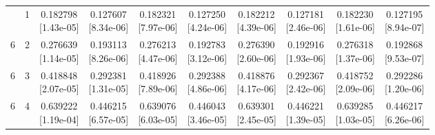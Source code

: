 \documentclass[12pt,letterpaper]{article}
\theoremstyle{plain}
\theoremstyle{definition}
\begin{document}
\begin{table}[p]
\begin{adjustbox}{max width=\linewidth}
\begin{tabular}{@{}rr*{8}{c}@{}}
\addlinespace[2pt]
6 & 1 & \shortstack{0.182798\\[-1pt]{\scriptsize[1.43e-05]}} & \shortstack{0.127607\\[-1pt]{\scriptsize[8.34e-06]}} & \shortstack{0.182321\\[-1pt]{\scriptsize[7.97e-06]}} & \shortstack{0.127250\\[-1pt]{\scriptsize[4.24e-06]}} & \shortstack{0.182212\\[-1pt]{\scriptsize[4.39e-06]}} & \shortstack{0.127181\\[-1pt]{\scriptsize[2.46e-06]}} & \shortstack{0.182230\\[-1pt]{\scriptsize[1.61e-06]}} & \shortstack{0.127195\\[-1pt]{\scriptsize[8.94e-07]}}\\
6 & 2 & \shortstack{0.276639\\[-1pt]{\scriptsize[1.14e-05]}} & \shortstack{0.193113\\[-1pt]{\scriptsize[8.26e-06]}} & \shortstack{0.276213\\[-1pt]{\scriptsize[4.47e-06]}} & \shortstack{0.192783\\[-1pt]{\scriptsize[3.12e-06]}} & \shortstack{0.276390\\[-1pt]{\scriptsize[2.60e-06]}} & \shortstack{0.192916\\[-1pt]{\scriptsize[1.93e-06]}} & \shortstack{0.276318\\[-1pt]{\scriptsize[1.37e-06]}} & \shortstack{0.192868\\[-1pt]{\scriptsize[9.53e-07]}}\\
6 & 3 & \shortstack{0.418848\\[-1pt]{\scriptsize[2.07e-05]}} & \shortstack{0.292381\\[-1pt]{\scriptsize[1.31e-05]}} & \shortstack{0.418926\\[-1pt]{\scriptsize[7.89e-06]}} & \shortstack{0.292388\\[-1pt]{\scriptsize[4.86e-06]}} & \shortstack{0.418876\\[-1pt]{\scriptsize[4.17e-06]}} & \shortstack{0.292367\\[-1pt]{\scriptsize[2.42e-06]}} & \shortstack{0.418752\\[-1pt]{\scriptsize[2.09e-06]}} & \shortstack{0.292286\\[-1pt]{\scriptsize[1.20e-06]}}\\
6 & 4 & \shortstack{0.639222\\[-1pt]{\scriptsize[1.19e-04]}} & \shortstack{0.446215\\[-1pt]{\scriptsize[6.57e-05]}} & \shortstack{0.639076\\[-1pt]{\scriptsize[6.03e-05]}} & \shortstack{0.446043\\[-1pt]{\scriptsize[3.46e-05]}} & \shortstack{0.639301\\[-1pt]{\scriptsize[2.45e-05]}} & \shortstack{0.446221\\[-1pt]{\scriptsize[1.39e-05]}} & \shortstack{0.639285\\[-1pt]{\scriptsize[1.03e-05]}} & \shortstack{0.446217\\[-1pt]{\scriptsize[6.26e-06]}}\\

\end{tabular}
\end{adjustbox}
\end{table}
\end{document}
